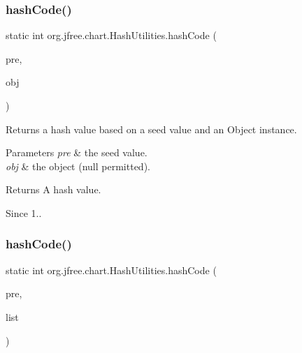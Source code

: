 \subsubsection{\texorpdfstring{hash\+Code()}{hashCode()}\hspace{0.1cm}{\footnotesize\ttfamily [8/11]}}
{\footnotesize\ttfamily static int org.\+jfree.\+chart.\+Hash\+Utilities.\+hash\+Code (\begin{DoxyParamCaption}\item[{int}]{pre,  }\item[{Object}]{obj }\end{DoxyParamCaption})\hspace{0.3cm}{\ttfamily [static]}}

Returns a hash value based on a seed value and an {\ttfamily Object} instance.


\begin{DoxyParams}{Parameters}
{\em pre} & the seed value. \\
\hline
{\em obj} & the object ({\ttfamily null} permitted).\\
\hline
\end{DoxyParams}
\begin{DoxyReturn}{Returns}
A hash value.
\end{DoxyReturn}
\begin{DoxySince}{Since}
1.. 
\end{DoxySince}
\mbox{\label{classorg_1_1jfree_1_1chart_1_1_hash_utilities_a64a891c3427c63ae6eddcd835c4951d5}} 
\subsubsection{\texorpdfstring{hash\+Code()}{hashCode()}\hspace{0.1cm}{\footnotesize\ttfamily [9/11]}}
{\footnotesize\ttfamily static int org.\+jfree.\+chart.\+Hash\+Utilities.\+hash\+Code (\begin{DoxyParamCaption}\item[{int}]{pre,  }\item[{Boolean\+List}]{list }\end{DoxyParamCaption})\hspace{0.3cm}{\ttfamily [static]}}

